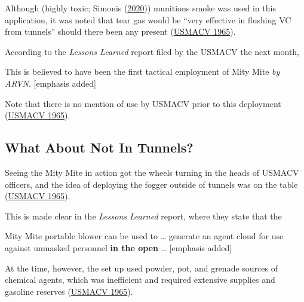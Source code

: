 \documentclass[
  11pt,
]{krantz}
\renewenvironment{quote}{\begin{VF}}{\end{VF}}
\begin{document}
Although (highly toxic; Simonis (\protect\hyperlink{ref-Simonis2020}{2020})) munitions smoke was used in this application, it was noted that tear gas would be ``very effective in flushing VC from tunnels'' should there been any present (\protect\hyperlink{ref-USMACV1965}{USMACV 1965}).

According to the \emph{Lessons Learned} report filed by the USMACV the next month,

\begin{quote}
This is believed to have been the first tactical employment of Mity Mite \emph{by ARVN}. {[}emphasis added{]}

\end{quote}

Note that there is no mention of use by USMACV prior to this deployment (\protect\hyperlink{ref-USMACV1965}{USMACV 1965}).

\hypertarget{what-about-not-in-tunnels}{%
\subsection{What About Not In Tunnels?}\label{what-about-not-in-tunnels}}

Seeing the Mity Mite in action got the wheels turning in the heads of USMACV officers, and the idea of deploying the fogger outside of tunnels was on the table (\protect\hyperlink{ref-USMACV1965}{USMACV 1965}).

This is made clear in the \emph{Lessons Learned} report, where they state that the

\begin{quote}
Mity Mite portable blower can be used to \ldots{} generate an agent cloud for use against unmasked personnel \textbf{in the open} \ldots{} {[}emphasis added{]}

\end{quote}

At the time, however, the set up used powder, pot, and grenade sources of chemical agents, which was inefficient and required extensive supplies and gasoline reserves (\protect\hyperlink{ref-USMACV1965}{USMACV 1965}).
\end{document}
